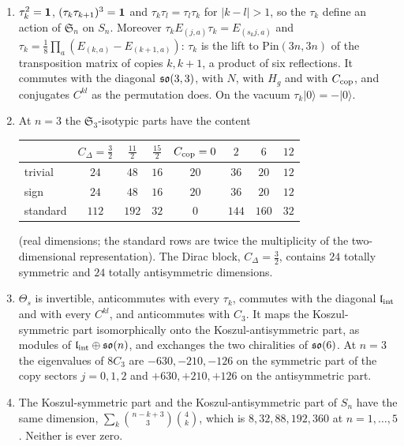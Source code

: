 \begin{proposition}
\label{e3:prop:koszul}
\begin{enumerate}[label=(\roman*),leftmargin=2.2em]
\item $\tau_k^2=\mathbf 1$, $(\tau_k\tau_{k+1})^3=\mathbf 1$ and $\tau_k\tau_l=\tau_l\tau_k$ for $|k-l|>1$, so the $\tau_k$ define an action of $\mathfrak S_n$ on $S_n$. Moreover
$\tau_kE_{(j,a)}\tau_k=E_{(s_kj,a)}$ and $\tau_k=\tfrac18\prod_a(E_{(k,a)}-E_{(k+1,a)})$: $\tau_k$ is the lift to $\mathrm{Pin}(3n,3n)$ of the transposition matrix of
copies $k,k+1$, a product of six reflections. It commutes with the diagonal $\mathfrak{so}(3,3)$, with $N$, with $H_g$ and with $C_{\rm cop}$, and conjugates
$C^{kl}$ as the permutation does. On the vacuum $\tau_k|0\rangle=-|0\rangle$.
\item At $n=3$ the $\mathfrak S_3$-isotypic parts have the content
\begin{center}
\begin{tabular}{@{}lccc|cccc@{}}
\toprule
 & $C_\Delta=\tfrac32$ & $\tfrac{11}2$ & $\tfrac{15}2$ & $C_{\rm cop}=0$ & $2$ & $6$ & $12$\\
\midrule
trivial & $24$ & $48$ & $16$ & $20$ & $36$ & $20$ & $12$\\
sign & $24$ & $48$ & $16$ & $20$ & $36$ & $20$ & $12$\\
standard & $112$ & $192$ & $32$ & $0$ & $144$ & $160$ & $32$\\
\bottomrule
\end{tabular}
\end{center}
(real dimensions; the standard rows are twice the multiplicity of the two-dimensional representation). The Dirac block, $C_\Delta=\tfrac32$,
contains $24$ totally symmetric and $24$ totally antisymmetric dimensions.
\item $\Theta_s$ is invertible, anticommutes with every $\tau_k$, commutes with the diagonal $\mathfrak l_{\rm int}$ and with every $C^{kl}$, and anticommutes with $C_3$. It
maps the Koszul-symmetric part isomorphically onto the Koszul-antisymmetric part, as modules of $\mathfrak l_{\rm int}\oplus\mathfrak{so}(n)$, and exchanges the two
chiralities of $\mathfrak{so}(6)$. At $n=3$ the eigenvalues of $8C_3$ are $-630,-210,-126$ on the symmetric part of the copy sectors $j=0,1,2$ and
$+630,+210,+126$ on the antisymmetric part.
\item The Koszul-symmetric part and the Koszul-antisymmetric part of $S_n$ have the same dimension, $\sum_k\binom{n-k+3}3\binom4k$, which is
$8,32,88,192,360$ at $n=1,\dots,5$. Neither is ever zero.
\end{enumerate}
\end{proposition}

